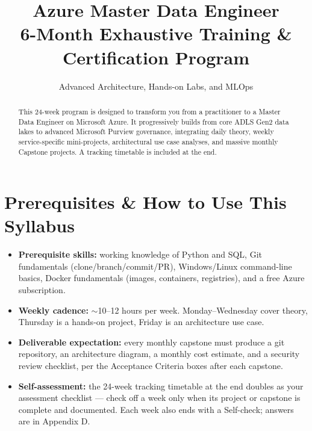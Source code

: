 \documentclass[11pt, a4paper]{article}
\title{\Huge \textbf{Azure Master Data Engineer}\\ \Large 6-Month Exhaustive Training \& Certification Program}
\author{Advanced Architecture, Hands-on Labs, and MLOps}
\date{}
\begin{document}
\maketitle

\begin{abstract}
\noindent This 24-week program is designed to transform you from a practitioner to a Master Data Engineer on Microsoft Azure. It progressively builds from core ADLS Gen2 data lakes to advanced Microsoft Purview governance, integrating daily theory, weekly service-specific mini-projects, architectural use case analyses, and massive monthly Capstone projects. A tracking timetable is included at the end.
\end{abstract}

\tableofcontents
\newpage

\section*{Prerequisites \& How to Use This Syllabus}
\begin{itemize}[label=-]
    \item \textbf{Prerequisite skills:} working knowledge of Python and SQL, Git fundamentals (clone/branch/commit/PR), Windows/Linux command-line basics, Docker fundamentals (images, containers, registries), and a free Azure subscription.
    \item \textbf{Weekly cadence:} $\sim$10--12 hours per week. Monday--Wednesday cover theory, Thursday is a hands-on project, Friday is an architecture use case.
    \item \textbf{Deliverable expectation:} every monthly capstone must produce a git repository, an architecture diagram, a monthly cost estimate, and a security review checklist, per the Acceptance Criteria boxes after each capstone.
    \item \textbf{Self-assessment:} the 24-week tracking timetable at the end doubles as your assessment checklist --- check off a week only when its project or capstone is complete and documented. Each week also ends with a Self-check; answers are in Appendix D.
\end{itemize}
\end{document}
